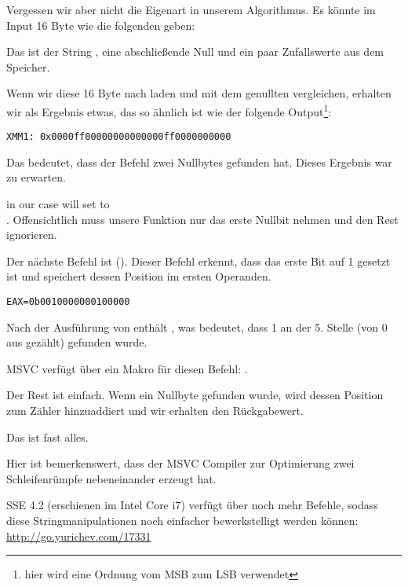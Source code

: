 Vergessen wir aber nicht die Eigenart in unserem Algorithmus. Es könnte im Input 16 Byte wie die folgenden geben:


Das ist der String , eine abschließende Null und ein paar Zufallswerte aus dem Speicher.

Wenn wir diese 16 Byte nach  laden und mit dem genullten  vergleichen, erhalten wir als Ergebnis etwas,
das so ähnlich ist wie der folgende Output\footnote{hier wird eine Ordnung vom \ac{MSB} zum \ac{LSB} verwendet}:

\begin{verbatim}
XMM1: 0x0000ff00000000000000ff0000000000
\end{verbatim}

Das bedeutet, dass der Befehl zwei Nullbytes gefunden hat. Dieses Ergebnis war zu erwarten.
 
 in our case will set \EAX to\\
.
Offensichtlich muss unsere Funktion nur das erste Nullbit nehmen und den Rest ignorieren.

\label{instruction_BSF}
Der nächste Befehl ist  (). 
Dieser Befehl erkennt, dass das erste Bit auf 1 gesetzt ist und speichert dessen Position im ersten Operanden.

\begin{verbatim}
EAX=0b0010000000100000
\end{verbatim}
Nach der Ausführung von  enthält , was bedeutet, dass 1 an der 5. Stelle (von 0 aus gezählt)
gefunden wurde.

MSVC verfügt über ein Makro für diesen Befehl: .

Der Rest ist einfach. Wenn ein Nullbyte gefunden wurde, wird dessen Position zum Zähler hinzuaddiert und wir erhalten
den Rückgabewert.

Das ist fast alles.

Hier ist bemerkenswert, dass der MSVC Compiler zur Optimierung zwei Schleifenrümpfe nebeneinander erzeugt hat.

SSE 4.2 (erschienen im Intel Core i7) verfügt über noch mehr Befehle, sodass diese Stringmanipulationen noch einfacher
bewerkstelligt werden können: \url{http://go.yurichev.com/17331}
